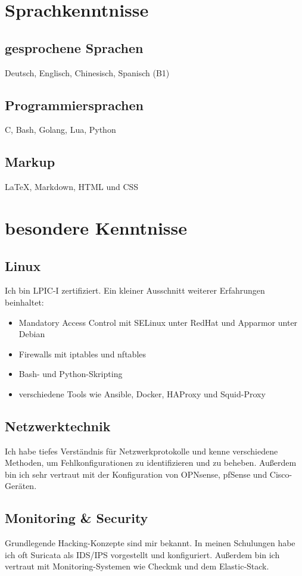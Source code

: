 \documentclass{article}
\begin{document}
\section{Sprachkenntnisse}

\subsection{gesprochene Sprachen}
Deutsch, Englisch, Chinesisch, Spanisch (B1)

\subsection{Programmiersprachen}
C, Bash, Golang, Lua, Python

\subsection{Markup}
\LaTeX, Markdown, HTML und CSS

\section{besondere Kenntnisse}

\subsection{Linux}
Ich bin LPIC-I zertifiziert.
Ein kleiner Ausschnitt weiterer Erfahrungen beinhaltet:
\begin{itemize}
\item{Mandatory Access Control mit SELinux unter RedHat und Apparmor unter Debian}
\item{Firewalls mit iptables und nftables}
\item{Bash- und Python-Skripting}
\item{verschiedene Tools wie Ansible, Docker, HAProxy und Squid-Proxy}
\end{itemize}

\subsection{Netzwerktechnik}
Ich habe tiefes Verständnis für Netzwerkprotokolle und kenne verschiedene Methoden, um Fehlkonfigurationen zu identifizieren und zu beheben.
Außerdem bin ich sehr vertraut mit der Konfiguration von OPNsense, pfSense und Cisco-Geräten.

\subsection{Monitoring \& Security}
Grundlegende Hacking-Konzepte sind mir bekannt.
In meinen Schulungen habe ich oft Suricata als IDS/IPS vorgestellt und konfiguriert.
Außerdem bin ich vertraut mit Monitoring-Systemen wie Checkmk und dem Elastic-Stack.
\end{document}
